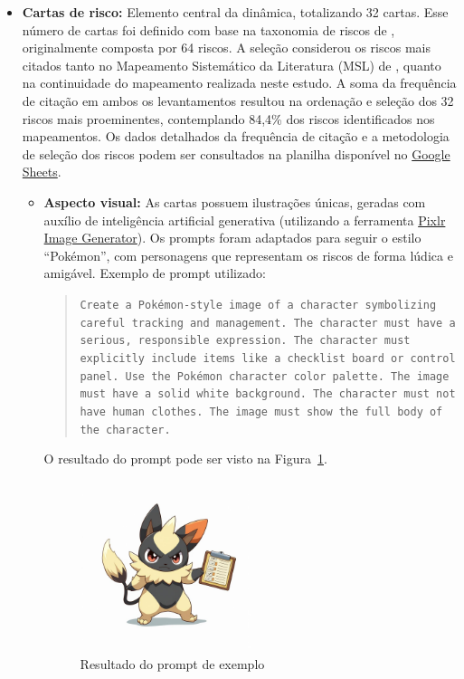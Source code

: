 \documentclass[
	12pt,
	openright,
	twoside,
	a4paper,
	english,
	brazil
	]{abntex2}
\begin{document}
\begin{itemize}
  \item \textbf{Cartas de risco:} Elemento central da dinâmica, totalizando 32 cartas. Esse número de cartas foi definido com base na taxonomia de riscos de \cite{carr_1993}, originalmente composta por 64 riscos. A seleção considerou os riscos mais citados tanto no Mapeamento Sistemático da Literatura (MSL) de , quanto na continuidade do mapeamento realizada neste estudo. A soma da frequência de citação em ambos os levantamentos resultou na ordenação e seleção dos 32 riscos mais proeminentes, contemplando 84,4\% dos riscos identificados nos mapeamentos. Os dados detalhados da frequência de citação e a metodologia de seleção dos riscos podem ser consultados na planilha disponível no \href{https://docs.google.com/spreadsheets/d/1eAkx4HNaHIKhkq774zI2VREVNmeKtol5uXiC7Jg-0Sc/edit?usp=sharing}{Google Sheets}.
  \begin{itemize}
    \item \textbf{Aspecto visual:} As cartas possuem ilustrações únicas, geradas com auxílio de inteligência artificial generativa (utilizando a ferramenta \href{https://pixlr.com/br/image-generator/}{Pixlr Image Generator}). Os prompts foram adaptados para seguir o estilo “Pokémon”, com personagens que representam os riscos de forma lúdica e amigável. Exemplo de prompt utilizado:
    \begin{quote}
      \raggedright
      \texttt{Create a Pokémon-style image of a character symbolizing careful tracking and management. The character must have a serious, responsible expression. The character must explicitly include items like a checklist board or control panel. Use the Pokémon character color palette. The image must have a solid white background. The character must not have human clothes. The image must show the full body of the character.}
    \end{quote}
    O resultado do prompt pode ser visto na Figura~\ref{fig:resultado-prompt}.
    \begin{figure}[H]
      \centering
      \caption{\label{fig:resultado-prompt}Resultado do prompt de exemplo}
      \includegraphics[width=0.5\textwidth]{pixlr-image-generator-4f8ab453.png}
    \end{figure}
    

\end{itemize}
\end{itemize}
\end{document}
